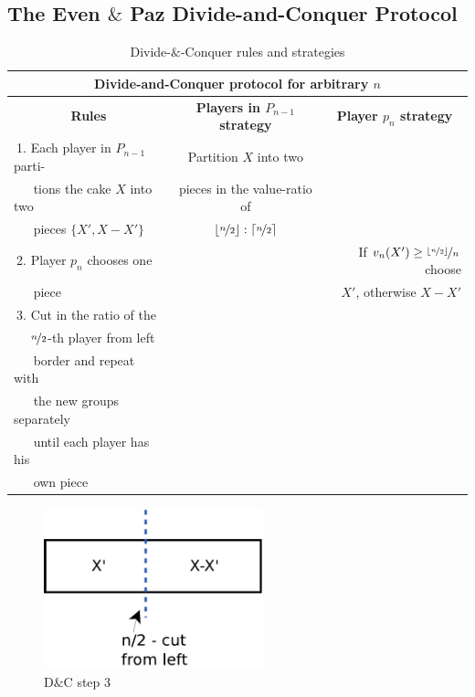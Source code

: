 \subsection{The Even $\&$ Paz Divide-and-Conquer Protocol}
\begin{table}[htb]
\begin{tabular*}{\textwidth}{|@{\extracolsep{\fill}}l|c|r|}
\hline
\hline
\multicolumn{3}{|c|}{\textbf{Divide-and-Conquer protocol for arbitrary $n$}}\\
\hline
\multicolumn{1}{|c|}{\textbf{Rules}}& \textbf{Players in $P_{n-1}$ strategy}&\multicolumn{1}{c|}{\textbf{Player $p_{n}$ strategy}}\\
\hline
$\:$1. Each player in $P_{n-1}$ parti-&Partition $X$ into two&\\
$\:\:\:\:\:\:\:$tions the cake $X$ into two&pieces in the value-ratio of&\\
$\:\:\:\:\:\:\:$pieces $\{X',X-X'\}$&$\lfloor \nicefrac{n}{2} \rfloor:\lceil \nicefrac{n}{2} \rceil$&\\
\hline
$\:$2. Player $p_n$ chooses one&&If $v_n(X') \geq \nicefrac{\lfloor \nicefrac{n}{2} \rfloor}{n}$ choose\\
$\:\:\:\:\:\:\:$piece&& $X'$, otherwise $X-X'$\\
\hline
$\:$3. Cut in the ratio of the&&\\$\:\:\:\:\:\:\nicefrac{n}{2}$-th player from left&&\\
$\:\:\:\:\:\:\:$border and repeat with&&\\
$\:\:\:\:\:\:\:$the new groups separately&&\\
$\:\:\:\:\:\:\:$until each player has his&&\\
$\:\:\:\:\:\:\:$own piece&&\\
\hline
\end{tabular*}
\caption{Divide-$\&$-Conquer rules and strategies}\label{dc}
\end{table}
\begin{figure}[h!]
		\centering
 		 \includegraphics[width=180pt]{bilder/dc1.pdf}
   \caption{D$\&$C step 3}
  	 \end{figure}
